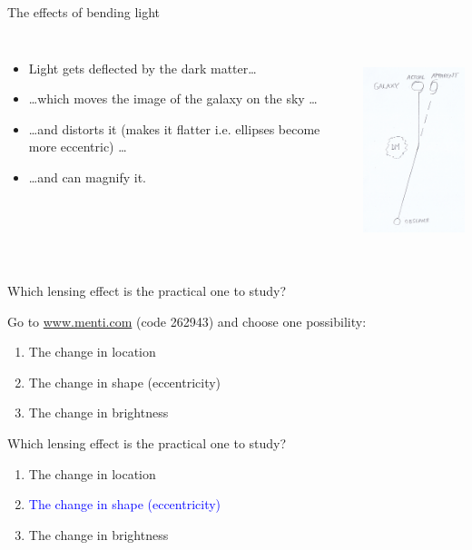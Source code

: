 \documentclass[usenames,dvipsnames]{beamer}
\newcommand{\mentiurl}[0]{{\url{www.menti.com}}}
\newcommand{\menticode}[0]{{262943}}
\newcommand{\mentiinvitation}[0]{Go to \mentiurl{} (code \menticode{}) and choose one possibility:\\}
\newcommand{\correctanswer}[1]{\textcolor{blue}{{#1} \checkmark}}
\begin{document}
\begin{frame}{The effects of bending light}
  \begin{columns}
    \begin{itemize}
      \item{Light gets deflected by the dark matter\ldots}
      \item{\ldots which moves the image of the galaxy on the sky \ldots}
	\item{\ldots and distorts it (makes it flatter i.e. ellipses become more eccentric) \ldots}
	\item{\ldots and can magnify it.}
    \end{itemize}
    \centering
    \includegraphics[height=6cm]{diagram_1.png}
  \end{columns}
\end{frame}


\begin{frame}{Which lensing effect is the practical one to study?}
  \begin{block}{}
    \mentiinvitation{}
    \begin{enumerate}
      \item{The change in location}
      \item{The change in shape (eccentricity)}
      \item{The change in brightness}
    \end{enumerate}
  \end{block}
\end{frame}

\begin{frame}{Which lensing effect is the practical one to study?}
  \begin{block}{}
    \begin{enumerate}
      \item{The change in location}
      \item{\correctanswer{The change in shape (eccentricity)}}
      \item{The change in brightness}
    \end{enumerate}
  \end{block}
\end{frame}
\end{document}

